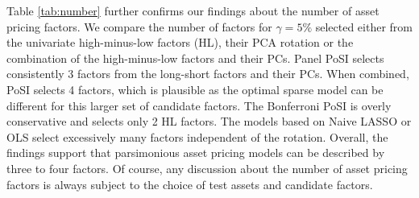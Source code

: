 \documentclass[11pt]{article}
\begin{document}
	Table \ref{tab:number} further confirms our findings about the number of asset pricing factors. We compare the number of factors for $\gamma=5\%$ selected either from the univariate high-minus-low factors (HL), their PCA rotation or the combination of the high-minus-low factors and their PCs. Panel PoSI selects consistently 3 factors from the long-short factors and their PCs. When combined, PoSI selects 4 factors, which is plausible as the optimal sparse model can be different for this larger set of candidate factors. The Bonferroni PoSI is overly conservative and selects only 2 HL factors. The models based on Naive LASSO or OLS select excessively many factors independent of the rotation. Overall, the findings support that parsimonious asset pricing models can be described by three to four factors. Of course, any discussion about the number of asset pricing factors is always subject to the choice of test assets and candidate factors. 
	
	
	
	
	
	
	
	
	
	
	
\end{document}

